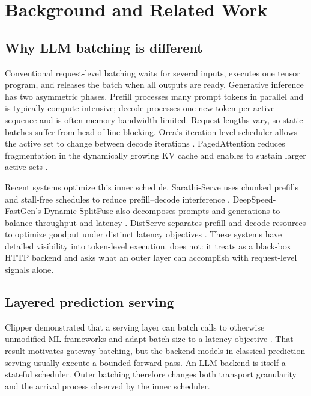 \section{Background and Related Work}
\label{sec:background}

\subsection{Why LLM batching is different}

Conventional request-level batching waits for several inputs, executes one
tensor program, and releases the batch when all outputs are ready. Generative
inference has two asymmetric phases. Prefill processes many prompt tokens in
parallel and is typically compute intensive; decode processes one new token per
active sequence and is often memory-bandwidth limited. Request lengths vary,
so static batches suffer from head-of-line blocking. Orca's iteration-level
scheduler allows the active set to change between decode iterations
\citep{yu2022orca}. PagedAttention reduces fragmentation in the dynamically
growing KV cache and enables \vllm{} to sustain larger active sets
\citep{kwon2023pagedattention}.

Recent systems optimize this inner schedule. Sarathi-Serve uses chunked
prefills and stall-free schedules to reduce prefill--decode interference
\citep{agrawal2024sarathiserve}. DeepSpeed-FastGen's Dynamic SplitFuse also
decomposes prompts and generations to balance throughput and latency
\citep{holmes2024fastgen}. DistServe separates prefill and decode resources to
optimize goodput under distinct latency objectives \citep{zhong2024distserve}.
These systems have detailed visibility into token-level execution. \adip{}
does not: it treats \vllm{} as a black-box HTTP backend and asks what an outer
layer can accomplish with request-level signals alone.

\subsection{Layered prediction serving}

Clipper demonstrated that a serving layer can batch calls to otherwise
unmodified ML frameworks and adapt batch size to a latency objective
\citep{crankshaw2017clipper}. That result motivates gateway batching, but the
backend models in classical prediction serving usually execute a bounded
forward pass. An LLM backend is itself a stateful scheduler. Outer batching
therefore changes both transport granularity and the arrival process observed
by the inner scheduler.

